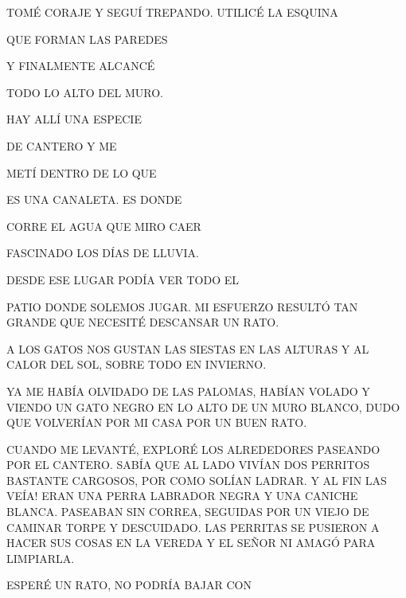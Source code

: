 \newpage
{}
TOMÉ CORAJE Y SEGUÍ TREPANDO. UTILICÉ LA ESQUINA 

QUE FORMAN LAS PAREDES  

Y FINALMENTE ALCANCÉ

TODO LO ALTO 		DEL MURO.

HAY ALLÍ UNA 		ESPECIE 

DE CANTERO Y ME

METÍ DENTRO DE LO QUE

ES  UNA CANALETA. ES DONDE

CORRE  			 EL AGUA QUE MIRO CAER

FASCINADO   LOS DÍAS DE LLUVIA.

DESDE ESE LUGAR  PODÍA VER TODO EL 

PATIO DONDE SOLEMOS JUGAR. MI ESFUERZO RESULTÓ TAN GRANDE QUE NECESITÉ DESCANSAR UN RATO.





\newpage
{}

A LOS GATOS NOS GUSTAN LAS SIESTAS EN LAS ALTURAS Y AL CALOR DEL SOL, SOBRE TODO EN INVIERNO.

YA ME HABÍA OLVIDADO DE LAS PALOMAS, HABÍAN VOLADO Y VIENDO UN GATO NEGRO EN LO ALTO DE UN MURO BLANCO, DUDO QUE VOLVERÍAN POR MI CASA POR UN BUEN RATO.

CUANDO ME LEVANTÉ, EXPLORÉ LOS ALREDEDORES PASEANDO POR EL CANTERO. SABÍA QUE AL LADO VIVÍAN DOS PERRITOS BASTANTE CARGOSOS, POR COMO SOLÍAN LADRAR. Y AL FIN LAS VEÍA! ERAN UNA PERRA LABRADOR NEGRA Y UNA CANICHE BLANCA. PASEABAN SIN CORREA, SEGUIDAS POR UN VIEJO DE CAMINAR TORPE Y DESCUIDADO. LAS PERRITAS SE PUSIERON A HACER SUS COSAS  EN LA VEREDA Y EL SEÑOR NI AMAGÓ PARA LIMPIARLA.



\newpage
{}
ESPERÉ UN RATO, NO PODRÍA BAJAR CON 

